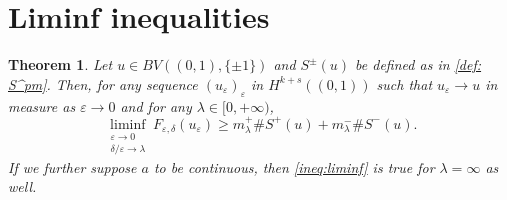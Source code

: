 \documentclass{article}
\newtheorem{Theorem}{Theorem}[section]
\theoremstyle{definition}
\newcommand{\e}{\varepsilon}
\newcommand{\del}{\delta}
\def\e{\varepsilon}
\begin{document}
\section{Liminf inequalities}
\label{Gamma-liminf}
\begin{Theorem}
    Let $u \in BV((0,1), \{\pm 1\})$ and $S^\pm(u)$ be defined as in \eqref{def: S^pm}. Then, for any sequence $(u_\e)_{\e}$ in $H^{k+s}((0,1))$ such that $u_\e \to u$ in measure as $\e \to 0$ and for any $\lambda\in [0,+\infty)$,
    \begin{equation}
    \label{ineq:liminf}
        \liminf_{\substack{\e\to 0\\  \del/\e\to\lambda}} F_{\e,\del}(u_\e) \geq m^+_\lambda\#S^+(u) + m^-_\lambda\# S^-(u).
    \end{equation}
    If we further suppose $a$ to be continuous, then \eqref{ineq:liminf} is true for $\lambda=\infty$ as well.
\end{Theorem}
\end{document}

